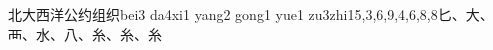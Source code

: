 \begin{EntryWithPhonetic}{北大西洋公约组织}{bei3 da4xi1 yang2 gong1 yue1 zu3zhi1}{5,3,6,9,4,6,8,8}{⼔、⼤、⾑、⽔、⼋、⽷、⽷、⽷}
\end{EntryWithPhonetic}

